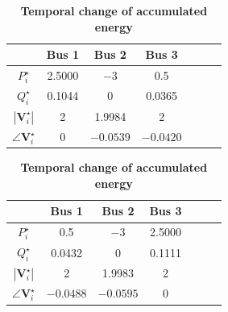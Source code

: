 \documentclass[graybox, envcountchap]{svmult}
\begin{document}
\begin{table}[ht]
\medskip
\caption{\textbf{Temporal change of accumulated energy}} \label{table:pflownl}
 \centering
  {
  \begin{minipage}{0.49\linewidth}
    \centering
  \begin{tabular}{|c|c|c|c|c|c|c|}
   \hline
 &  Bus 1 & Bus 2 & Bus 3 \\
   \hline 
   $P_i^{\star}$ & 2.5000 & $-3$ & 0.5 \\
   \hline
   $Q_i^{\star}$ & 0.1044 & 0 & 0.0365 \\
   \hline
   $|\bm{V}_i^{\star}|$ & 2 & 1.9984 & 2 \\
   \hline
   $\angle \bm{V}_i^{\star}$ & 0 & $-0.0539$ & $-0.0420$ \\
   \hline
  \end{tabular}
  \end{minipage}
  \begin{minipage}{0.49\linewidth}
    \centering
  \begin{tabular}{|c|c|c|c|c|c|c|}
   \hline
 &  Bus 1 & Bus 2 & Bus 3 \\
   \hline 
   $P_i^{\star}$ & 0.5 & $-3$ & 2.5000 \\
   \hline
   $Q_i^{\star}$ & 0.0432 & 0 & 0.1111 \\
   \hline
   $|\bm{V}_i^{\star}|$ & 2 & 1.9983 & 2 \\
   \hline
   $\angle \bm{V}_i^{\star}$ & $-0.0488$ & $-0.0595$ & 0 \\
   \hline
  \end{tabular}
  \end{minipage}
  }
\end{table}
\end{document}
